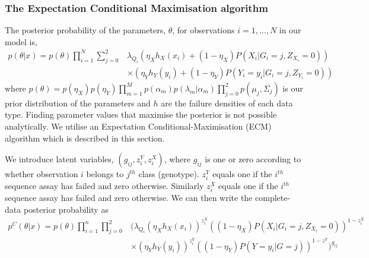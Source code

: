 \subsubsection{The Expectation Conditional Maximisation algorithm}
\label{chap2:inference:ecm}

The posterior probability of the parameters, $\theta$, for observations $i=1,\ldots,N$ in our model is,
\begin{eqnarray} p(\theta|x) = p(\theta)\prod^N_{i=1} \sum_{j=0}^2 &\lambda_{Q_i}\left(\eta_Xh_X(x_i) + (1-\eta_X) P(X_i| G_i = j,Z_{X_i}=0) \right)\nonumber\\
& \times\left(\eta_Yh_Y(y_i) + (1-\eta_Y)P(Y_i=y_i|G_i=j,Z_{Y_i}=0) \right)
\end{eqnarray}
where $p(\theta) = p(\eta_X)p(\eta_Y)\prod^M_{m=1}p(\alpha_m)p(\lambda_m|\alpha_m)\prod^2_{j=0}p(\mu_j,\Sigma_j)$ is our prior distribution of the parameters and $h$ are the failure densities of each data type. Finding parameter values that maximise the posterior is not possible analytically.  We utilise an Expectation Conditional-Maximisation (ECM) algorithm which is described in this section.

We introduce latent variables, $(g_{ij},z_i^Y,z_i^X)$, where $g_{ij}$ is one or zero according to whether observation $i$ belongs to $j^{th}$ class (genotype). $z_i^Y$ equals one if the $i^{th}$ sequence assay has failed and zero otherwise.  Similarly $z_i^X$ equals one if the $i^{th}$ sequence assay has failed and zero otherwise. We can then write the complete-data posterior probability as
\begin{eqnarray} p^C(\theta|x) = p(\theta)\prod^n_{i=1} \prod^2_{j=0} &\Big(\lambda_{Q_i} (\eta_Xh_X(x_i))^{z_i^X}((1-\eta_X)P(X_i| G_i = j,Z_{X_i}=0))^{1-z_i^X} \nonumber \\
&\times(\eta_Yh_Y(y_i))^{z_i^Y}((1-\eta_Y)P(Y=y_i|G=j))^{1-z^Y} \Big)^{g_{ij}}\end{eqnarray}


